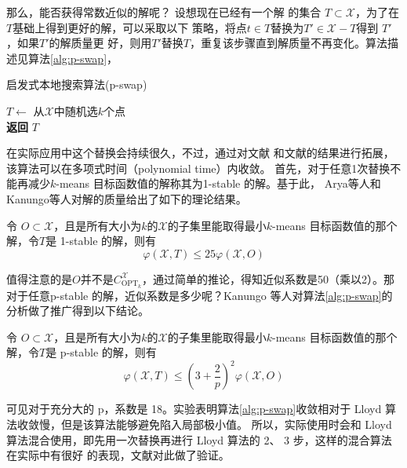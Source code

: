 那么，能否获得常数近似的解呢？ 设想现在已经有一个解
的集合 $T \subset \mathcal{X}$，为了在$T$基础上得到更好的解，可以采取以下
策略，将点$t\in T$替换为$T' \in \mathcal{X}-T$得到 $T'$，如果$T'$的解质量更
好，则用$T'$替换$T$，重复该步骤直到解质量不再变化。算法描
述见算法\ref{alg:p-swap}，
\begin{algorithm}
    \caption{启发式本地搜索算法(p-swap)}\label{alg:p-swap}
    $T \gets $ 从$\mathcal{X}$中随机选$k$个点 \\
    \textbf{返回} $T$
\end{algorithm}
在实际应用中这个替换会持续很久，不过，通过对文献
\cite{arya2004local}和文献\cite{charikar1999improved}的结果进行拓展，该算法可以在多项式时间（polynomial time）内收敛。 首先，对于任意1次替换不能再减少$k$-means 目标函数值的解称其为1-stable 的解。基于此， Arya等人和Kanungo等人对解的质量给出了如下的理论结果。
\begin{theorem}[1-stable的解的质量]
    令 $O \subset \mathcal{X}$，且是所有大小为$k$的$\mathcal{X}$的子集里能取得最小$k$-means 目标函数值的那个解，令$T$是 1-stable 的解，则有
    \begin{equation*}
        \varphi(\mathcal{X},T) \leq 25 \varphi(\mathcal{X},O)
    \end{equation*}
\end{theorem}
值得注意的是$O$并不是$C_{\text{OPT}_k}^{\mathcal{X}}$，通过简单的推论，得知近似系数是50（乘以2）。那对于任意p-stable 的解，近似系数是多少呢？Kanungo 等人对算法\ref{alg:p-swap}的分析做了推广得到以下结论。
\begin{theorem}[p-stable的解的质量]
    令 $O \subset \mathcal{X}$，且是所有大小为$k$的$\mathcal{X}$的子集里能取得最小$k$-means 目标函数值的那个解，令$T$是 p-stable 的解，则有
    \begin{equation*}
        \varphi(\mathcal{X},T) \leq (3+\frac{2}{p})^2 \varphi(\mathcal{X},O)
    \end{equation*}
\end{theorem}
可见对于充分大的 p，系数是 18。实验表明算法\ref{alg:p-swap}收敛相对于 Lloyd 算法收敛慢，但是该算法能够避免陷入局部极小值。
所以，实际使用时会和 Lloyd 算法混合使用，即先用一次替换再进行 Lloyd 算法的 2、 3 步，这样的混合算法在实际中有很好
的表现，文献\cite{kanungo2004local}对此做了验证。


